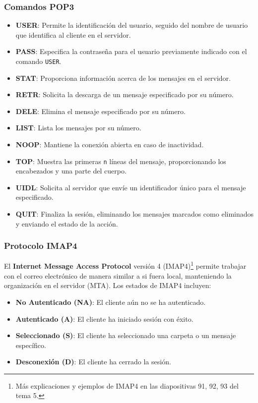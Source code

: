 \documentclass[a4paper,12pt]{article}
\begin{document}
\subsubsection{Comandos POP3}

\begin{itemize}
    \item \textbf{USER}: Permite la identificación del usuario, seguido del nombre de usuario que identifica al cliente en el servidor.
    \item \textbf{PASS}: Especifica la contraseña para el usuario previamente indicado con el comando \texttt{USER}.
    \item \textbf{STAT}: Proporciona información acerca de los mensajes en el servidor.
    \item \textbf{RETR}: Solicita la descarga de un mensaje especificado por su número.
    \item \textbf{DELE}: Elimina el mensaje especificado por su número.
    \item \textbf{LIST}: Lista los mensajes por su número.
    \item \textbf{NOOP}: Mantiene la conexión abierta en caso de inactividad.
    \item \textbf{TOP}: Muestra las primeras \texttt{n} líneas del mensaje, proporcionando los encabezados y una parte del cuerpo.
    \item \textbf{UIDL}: Solicita al servidor que envíe un identificador único para el mensaje especificado.
    \item \textbf{QUIT}: Finaliza la sesión, eliminando los mensajes marcados como eliminados y enviando el estado de la acción.
\end{itemize}

\subsubsection{Protocolo IMAP4}

El \textbf{Internet Message Access Protocol} versión 4 (IMAP4)\footnote{Más explicaciones y ejemplos de IMAP4 en las diapositivas 91, 92, 93 del tema 5.} permite trabajar con el correo electrónico de manera similar a si fuera local, manteniendo la organización en el servidor (MTA). Los estados de IMAP4 incluyen:

\begin{itemize}
    \item \textbf{No Autenticado (NA)}: El cliente aún no se ha autenticado.
    \item \textbf{Autenticado (A)}: El cliente ha iniciado sesión con éxito.
    \item \textbf{Seleccionado (S)}: El cliente ha seleccionado una carpeta o un mensaje específico.
    \item \textbf{Desconexión (D)}: El cliente ha cerrado la sesión.
\end{itemize}
\end{document}

